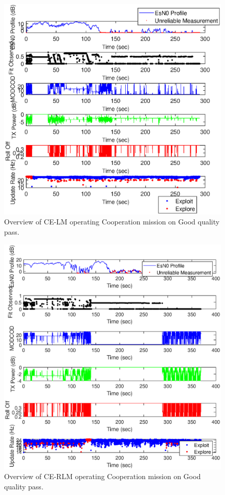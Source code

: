 \begin{figure}[ht]
\centering
\includegraphics[width=\textwidth]{figures/flight_results/coop_good_lm_overview.eps}
\caption{Overview of CE-LM operating Cooperation mission on Good quality pass.}
\label{fig:flight_lm_coop_good_overview}
\end{figure}
\begin{figure}[ht]
\centering
\includegraphics[width=\textwidth]{figures/flight_results/coop_good_rlm_overview.eps}
\caption{Overview of CE-RLM operating Cooperation mission on Good quality pass.}
\label{fig:flight_rlm_coop_good_overview}
\end{figure}
